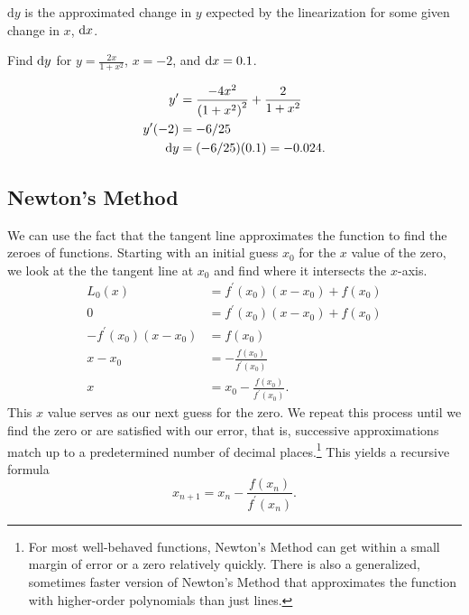 $\mathrm{d}y$ is the approximated change in $y$ expected by the linearization for some given change in $x$, $\mathrm{d} x$.

\begin{example}
	Find $\mathrm{d} y$ for $y=\frac{2x}{1+x^2}$, $x=-2$, and $\mathrm{d} x = 0.1$.
\end{example}
\begin{answer}
	\begin{align*}
		y^\prime &= \frac{-4x^2}{\left(1+x^2\right)^2} + \frac{2}{1+x^2} \\
		y^\prime(-2) &= -6/25 \\
		\mathrm{d} y &= (-6/25)(0.1) = -0.024.
	\end{align*}
\end{answer}

\subsection{Newton's Method}
We can use the fact that the tangent line approximates the function to find the zeroes of functions.
Starting with an initial guess $x_0$ for the $x$ value of the zero, we look at the the tangent line at $x_0$ and find where it intersects the $x$-axis.
\begin{align*}
	L_0(x) &= f^\prime(x_0)(x - x_0) + f(x_0) \\
	0 &= f^\prime(x_0)(x - x_0) + f(x_0) \\
	-f^\prime(x_0)(x - x_0) &= f(x_0) \\
	x - x_0 &= -\frac{f(x_0)}{f^\prime(x_0)} \\
	x &= x_0 - \frac{f(x_0)}{f^\prime(x_0)}.
\end{align*}
This $x$ value serves as our next guess for the zero.
We repeat this process until we find the zero or are satisfied with our error, that is, successive approximations match up to a predetermined number of decimal places.\footnote{For most well-behaved functions, Newton's Method can get within a small margin of error or a zero relatively quickly. There is also a generalized, sometimes faster version of Newton's Method that approximates the function with higher-order polynomials than just lines.}
This yields a recursive formula
\begin{equation*}
	x_{n+1} = x_n - \frac{f(x_n)}{f^\prime(x_n)}.
\end{equation*}

